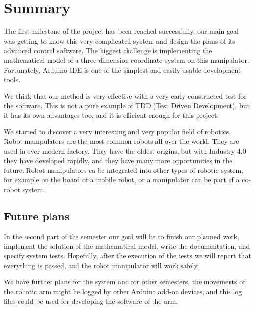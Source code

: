 \chapter{Summary}

	\hspace{15pt}The first milestone of the project has been reached successfully, our main goal was getting to know this very complicated system and design the plans of its advanced control software. The biggest challenge is implementing the mathematical model of a three-dimension coordinate system on this manipulator. Fortunately, Arduino IDE is one of the simplest and easily usable development tools.


	We think that our method is very effective with a very early constructed test for the software. This is not a pure example of TDD (Test Driven Development), but it has its own advantages too, and it is efficient enough for this project.


	We started to discover a very interesting and very popular field of robotics. Robot manipulators are the most common robots all over the world. They are used in ever modern factory. They have the oldest origins, but with Industry 4.0 they have developed rapidly, and they have many more opportunities in the future. Robot manipulators ca be integrated into other types of robotic system, for example on the board of a mobile robot, or a manipulator can be part of a co-robot system.


	\section{Future plans}
		
		\hspace{15pt}In the second part of the semester our goal will be to finish our planned work, implement the solution of the mathematical model, write the documentation, and specify system tests. Hopefully, after the execution of the tests we will report that everything is passed, and the robot manipulator will work safely.
		
		
	We have further plans for the system and for other semesters, the movements of the robotic arm might be logged by other Arduino add-on devices, and this log files could be used for developing the software of the arm.